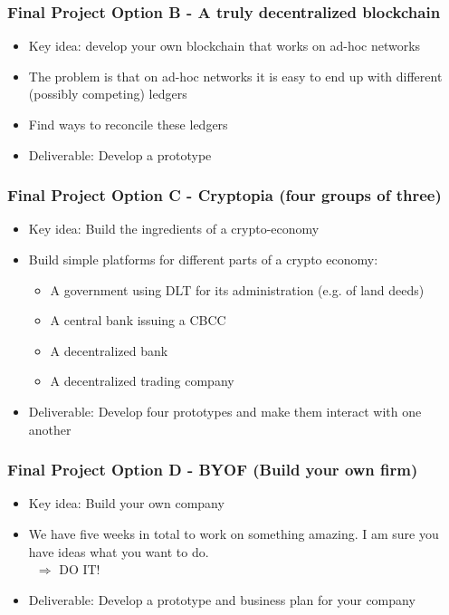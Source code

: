 \documentclass[10pt]{beamer}
\begin{document}
\begin{frame}
  \frametitle{Final Project Option B - A truly decentralized blockchain}
  \begin{itemize}\itemsep10pt
    \item Key idea: develop your own blockchain that works on ad-hoc networks
    \item The problem is that on ad-hoc networks it is easy to end up with different (possibly competing) ledgers
    \item Find ways to reconcile these ledgers
    \item Deliverable: Develop a prototype
  \end{itemize}
\end{frame}

\begin{frame}
  \frametitle{Final Project Option C - Cryptopia (four groups of three)}
  \begin{itemize}\itemsep10pt
    \item Key idea: Build the ingredients of a crypto-economy
    \item Build simple platforms for different parts of a crypto economy:
    \begin{itemize}\itemsep5pt
      \item A government using DLT for its administration (e.g. of land deeds)
      \item A central bank issuing a CBCC
      \item A decentralized bank
      \item A decentralized trading company
    \end{itemize}
    \item Deliverable: Develop four prototypes and make them interact with one another
  \end{itemize}
\end{frame}

\begin{frame}
  \frametitle{Final Project Option D - BYOF (Build your own firm)}
  \begin{itemize}\itemsep10pt
    \item Key idea: Build your own company
    \item We have five weeks in total to work on something amazing. I am sure you have ideas what you want to do.\\
    ~\hfill $\Rightarrow$ DO IT!
    \item Deliverable: Develop a prototype and business plan for your company
  \end{itemize}
\end{frame}
\end{document}
